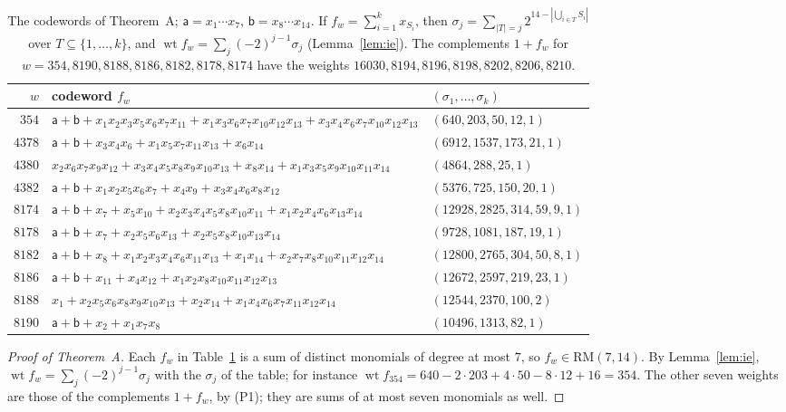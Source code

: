 \documentclass[11pt]{article}
\theoremstyle{remark}
\newcommand{\RM}{\mathrm{RM}}
\DeclareMathOperator{\wt}{wt}
\newcommand{\sa}{\mathsf a}
\newcommand{\sbb}{\mathsf b}
\begin{document}
\begin{table}[t]\centering\footnotesize
\begin{tabular}{@{}r>{\raggedright\arraybackslash}p{}l@{}}
\toprule
$w$ & codeword $f_w$ & $(\sigma_1,\dots,\sigma_k)$\\
\midrule
$354$ & $\sa+\sbb+x_1x_2x_3x_5x_6x_7x_{11}+x_1x_3x_6x_7x_{10}x_{12}x_{13}+x_3x_4x_6x_7x_{10}x_{12}x_{13}$ & $(640,203,50,12,1)$\\
$4378$ & $\sa+\sbb+x_3x_4x_6+x_1x_5x_7x_{11}x_{13}+x_6x_{14}$ & $(6912,1537,173,21,1)$\\
$4380$ & $x_2x_6x_7x_9x_{12}+x_3x_4x_5x_8x_9x_{10}x_{13}+x_8x_{14}+x_1x_3x_5x_9x_{10}x_{11}x_{14}$ & $(4864,288,25,1)$\\
$4382$ & $\sa+\sbb+x_1x_2x_5x_6x_7+x_4x_9+x_3x_4x_6x_8x_{12}$ & $(5376,725,150,20,1)$\\
$8174$ & $\sa+\sbb+x_7+x_5x_{10}+x_2x_3x_4x_5x_8x_{10}x_{11}+x_1x_2x_4x_6x_{13}x_{14}$ & $(12928,2825,314,59,9,1)$\\
$8178$ & $\sa+\sbb+x_7+x_2x_5x_6x_{13}+x_2x_5x_8x_{10}x_{13}x_{14}$ & $(9728,1081,187,19,1)$\\
$8182$ & $\sa+\sbb+x_8+x_1x_2x_3x_4x_6x_{11}x_{13}+x_1x_{14}+x_2x_7x_8x_{10}x_{11}x_{12}x_{14}$ & $(12800,2765,304,50,8,1)$\\
$8186$ & $\sa+\sbb+x_{11}+x_4x_{12}+x_1x_2x_8x_{10}x_{11}x_{12}x_{13}$ & $(12672,2597,219,23,1)$\\
$8188$ & $x_1+x_2x_5x_6x_8x_9x_{10}x_{13}+x_2x_{14}+x_1x_4x_6x_7x_{11}x_{12}x_{14}$ & $(12544,2370,100,2)$\\
$8190$ & $\sa+\sbb+x_2+x_1x_7x_8$ & $(10496,1313,82,1)$\\
\bottomrule
\end{tabular}
\caption{The codewords of Theorem~A; $\sa=x_1\cdots x_7$, $\sbb=x_8\cdots
x_{14}$. If $f_w=\sum_{i=1}^kx_{S_i}$, then $\sigma_j=\sum_{|T|=j}
2^{14-|\bigcup_{i\in T}S_i|}$ over $T\subseteq\{1,\dots,k\}$, and $\wt
f_w=\sum_j(-2)^{j-1}\sigma_j$ (Lemma~\ref{lem:ie}). The complements $1+f_w$
for $w=354,8190,8188,8186,8182,8178,8174$ have the weights
$16030,8194,8196,8198,8202,8206,8210$.}\label{tab:wit}
\end{table}

\begin{proof}[Proof of Theorem~A]
Each $f_w$ in Table~\ref{tab:wit} is a sum of distinct monomials of degree at
most $7$, so $f_w\in\RM(7,14)$. By Lemma~\ref{lem:ie}, $\wt
f_w=\sum_j(-2)^{j-1}\sigma_j$ with the $\sigma_j$ of the table; for instance
$\wt f_{354}=640-2\cdot203+4\cdot50-8\cdot12+16=354$. The other seven weights
are those of the complements $1+f_w$, by (P1); they are sums of at most seven
monomials as well.
\end{proof}
\end{document}
